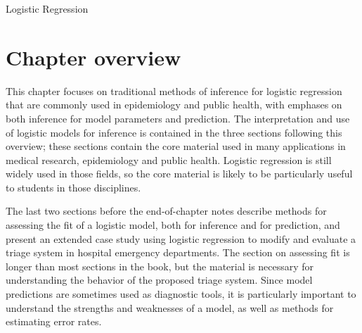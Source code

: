 \begin{chapterpage}{Logistic Regression}
   \label{LogisticRegression}
 \end{chapterpage}

\renewcommand{\chapterfolder}{ch_logistic_regression_oi_biostat}

\noindent%




\setlength\parindent{20pt}

\section{Chapter overview}
\label{chapterOverview}

This chapter focuses on traditional methods of inference for logistic regression that are commonly used in epidemiology and public health, with emphases on both inference for model parameters and prediction.  The interpretation and use of logistic models for inference is contained in the three sections following this overview; these sections contain the core material used in many applications in medical research, epidemiology and public health.  Logistic regression is still widely used in those fields, so the core material is likely to be particularly useful to students in those disciplines.

The last two sections before the end-of-chapter notes describe methods for assessing the fit of a logistic model, both for inference and for prediction, and present an extended case study using logistic regression to modify and evaluate a triage system in hospital emergency departments.  The section on assessing fit is longer than most sections in the book, but the material is necessary for understanding the behavior of the  proposed triage system. Since model predictions are sometimes used as diagnostic tools, it is particularly important to understand the strengths and weaknesses of a model, as well as methods for estimating error rates.


